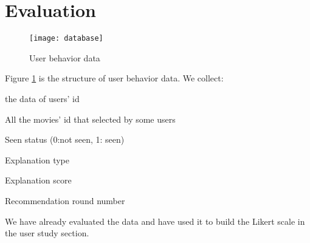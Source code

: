 
\section{Evaluation}
\label{ch:evaluation}


\begin{figure}[h]
\caption{User behavior data}
\label{figure:5-1}
\centering
\texttt{[image: database]}
\end{figure}

Figure \ref{figure:5-1} is the structure of user behavior data. We collect:
\par the data of users' id
\par All the movies' id that selected by some users
\par Seen status (0:not seen, 1: seen)
\par Explanation type
\par Explanation score
\par Recommendation round number
\par We have already evaluated the data and have used it to build the Likert scale in the user study section.

\cleardoublepage